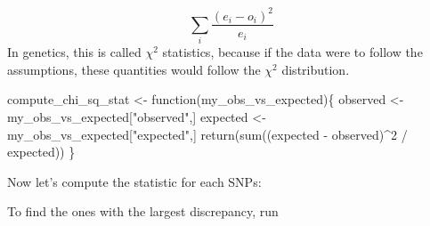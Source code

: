 \documentclass[
  letterpaper,
  DIV=11,
  numbers=noendperiod]{scrreprt}
\newenvironment{Shaded}{\begin{snugshade}}{\end{snugshade}}
\newcommand{\AttributeTok}[1]{\textcolor[rgb]{0.40,0.45,0.13}{#1}}
\newcommand{\CommentTok}[1]{\textcolor[rgb]{0.37,0.37,0.37}{#1}}
\newcommand{\ConstantTok}[1]{\textcolor[rgb]{0.56,0.35,0.01}{#1}}
\newcommand{\ControlFlowTok}[1]{\textcolor[rgb]{0.00,0.23,0.31}{#1}}
\newcommand{\DecValTok}[1]{\textcolor[rgb]{0.68,0.00,0.00}{#1}}
\newcommand{\FunctionTok}[1]{\textcolor[rgb]{0.28,0.35,0.67}{#1}}
\newcommand{\NormalTok}[1]{\textcolor[rgb]{0.00,0.23,0.31}{#1}}
\newcommand{\OtherTok}[1]{\textcolor[rgb]{0.00,0.23,0.31}{#1}}
\newcommand{\SpecialCharTok}[1]{\textcolor[rgb]{0.37,0.37,0.37}{#1}}
\newcommand{\StringTok}[1]{\textcolor[rgb]{0.13,0.47,0.30}{#1}}
\begin{document}
\[
\sum_i \frac{(e_i - o_i)^2}{e_i}
\] In genetics, this is called \(\chi^2\) statistics, because if the
data were to follow the assumptions, these quantities would follow the
\(\chi^2\) distribution.

\begin{Shaded}
\begin{Highlighting}[]
\NormalTok{compute\_chi\_sq\_stat }\OtherTok{\textless{}{-}} \ControlFlowTok{function}\NormalTok{(my\_obs\_vs\_expected)\{}
\NormalTok{  observed }\OtherTok{\textless{}{-}}\NormalTok{ my\_obs\_vs\_expected[}\StringTok{"observed"}\NormalTok{,]}
\NormalTok{  expected }\OtherTok{\textless{}{-}}\NormalTok{ my\_obs\_vs\_expected[}\StringTok{"expected"}\NormalTok{,]}
  \FunctionTok{return}\NormalTok{(}\FunctionTok{sum}\NormalTok{((expected }\SpecialCharTok{{-}}\NormalTok{ observed)}\SpecialCharTok{\^{}}\DecValTok{2} \SpecialCharTok{/}\NormalTok{ expected))}
\NormalTok{\}}
\end{Highlighting}
\end{Shaded}

Now let's compute the statistic for each SNPs:

\begin{Shaded}
\end{Shaded}

To find the ones with the largest discrepancy, run

\begin{Shaded}
\end{Shaded}
\end{document}

